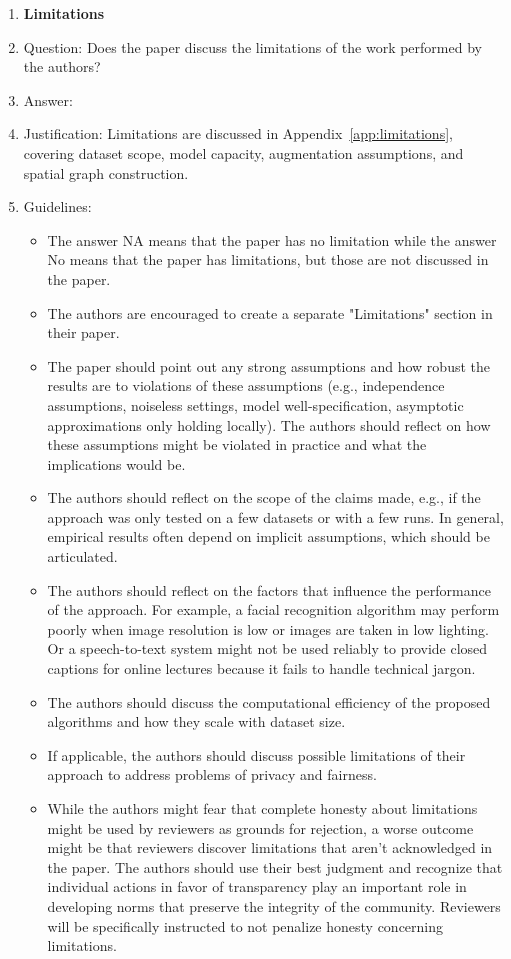 \documentclass{article}
\theoremstyle{plain}
\theoremstyle{definition}
\begin{document}
\begin{enumerate}
  \item {\bf Limitations}
  \item[] Question: Does the paper discuss the limitations of the work performed by the authors?
  \item[] Answer: \answerYes{}
  \item[] Justification: Limitations are discussed in Appendix~\ref{app:limitations}, covering dataset scope, model capacity, augmentation assumptions, and spatial graph construction.
  \item[] Guidelines:
    \begin{itemize}
      \item The answer NA means that the paper has no limitation while the answer No means that the paper has limitations, but those are not discussed in the paper.
      \item The authors are encouraged to create a separate "Limitations" section in their paper.
      \item The paper should point out any strong assumptions and how robust the results are to violations of these assumptions (e.g., independence assumptions, noiseless settings, model well-specification, asymptotic approximations only holding locally). The authors should reflect on how these assumptions might be violated in practice and what the implications would be.
      \item The authors should reflect on the scope of the claims made, e.g., if the approach was only tested on a few datasets or with a few runs. In general, empirical results often depend on implicit assumptions, which should be articulated.
      \item The authors should reflect on the factors that influence the performance of the approach. For example, a facial recognition algorithm may perform poorly when image resolution is low or images are taken in low lighting. Or a speech-to-text system might not be used reliably to provide closed captions for online lectures because it fails to handle technical jargon.
      \item The authors should discuss the computational efficiency of the proposed algorithms and how they scale with dataset size.
      \item If applicable, the authors should discuss possible limitations of their approach to address problems of privacy and fairness.
      \item While the authors might fear that complete honesty about limitations might be used by reviewers as grounds for rejection, a worse outcome might be that reviewers discover limitations that aren't acknowledged in the paper. The authors should use their best judgment and recognize that individual actions in favor of transparency play an important role in developing norms that preserve the integrity of the community. Reviewers will be specifically instructed to not penalize honesty concerning limitations.
    \end{itemize}


\end{enumerate}
\end{document}

